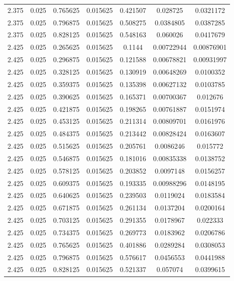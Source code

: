 \begin{table}[bh]
\begin{center}
{\begin{tabular}{ccccccc}
2.375	 & 0.025 & 	0.765625	 & 0.015625	 & 0.421507	 & 0.028725	 & 0.0321172 \\ 
2.375	 & 0.025 & 	0.796875	 & 0.015625	 & 0.508275	 & 0.0384805	 & 0.0387285 \\ 
2.375	 & 0.025 & 	0.828125	 & 0.015625	 & 0.548163	 & 0.060026	 & 0.0417679 \\ 
2.425	 & 0.025 & 	0.265625	 & 0.015625	 & 0.1144	 & 0.00722944	 & 0.00876901 \\ 
2.425	 & 0.025 & 	0.296875	 & 0.015625	 & 0.121588	 & 0.00678821	 & 0.00931997 \\ 
2.425	 & 0.025 & 	0.328125	 & 0.015625	 & 0.130919	 & 0.00648269	 & 0.0100352 \\ 
2.425	 & 0.025 & 	0.359375	 & 0.015625	 & 0.135398	 & 0.00627132	 & 0.0103785 \\ 
2.425	 & 0.025 & 	0.390625	 & 0.015625	 & 0.165371	 & 0.00700367	 & 0.012676 \\ 
2.425	 & 0.025 & 	0.421875	 & 0.015625	 & 0.198265	 & 0.00761887	 & 0.0151974 \\ 
2.425	 & 0.025 & 	0.453125	 & 0.015625	 & 0.211314	 & 0.00809701	 & 0.0161976 \\ 
2.425	 & 0.025 & 	0.484375	 & 0.015625	 & 0.213442	 & 0.00828424	 & 0.0163607 \\ 
2.425	 & 0.025 & 	0.515625	 & 0.015625	 & 0.205761	 & 0.0086246	 & 0.015772 \\ 
2.425	 & 0.025 & 	0.546875	 & 0.015625	 & 0.181016	 & 0.00835338	 & 0.0138752 \\ 
2.425	 & 0.025 & 	0.578125	 & 0.015625	 & 0.203852	 & 0.0097148	 & 0.0156257 \\ 
2.425	 & 0.025 & 	0.609375	 & 0.015625	 & 0.193335	 & 0.00988296	 & 0.0148195 \\ 
2.425	 & 0.025 & 	0.640625	 & 0.015625	 & 0.239503	 & 0.0119024	 & 0.0183584 \\ 
2.425	 & 0.025 & 	0.671875	 & 0.015625	 & 0.261134	 & 0.0137204	 & 0.0200164 \\ 
2.425	 & 0.025 & 	0.703125	 & 0.015625	 & 0.291355	 & 0.0178967	 & 0.022333 \\ 
2.425	 & 0.025 & 	0.734375	 & 0.015625	 & 0.269773	 & 0.0183962	 & 0.0206786 \\ 
2.425	 & 0.025 & 	0.765625	 & 0.015625	 & 0.401886	 & 0.0289284	 & 0.0308053 \\ 
2.425	 & 0.025 & 	0.796875	 & 0.015625	 & 0.576617	 & 0.0456553	 & 0.0441988 \\ 
2.425	 & 0.025 & 	0.828125	 & 0.015625	 & 0.521337	 & 0.057074	 & 0.0399615 \\ 

\end{tabular}}
\end{center}
\end{table}
